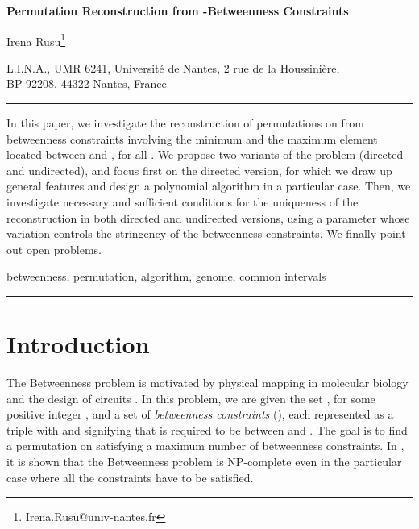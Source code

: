 \documentclass{article}
\begin{document}
\begin{center}
{\bf\large Permutation Reconstruction from -Betweenness Constraints}\\




\vspace*{1cm}

Irena Rusu\footnote{Irena.Rusu@univ-nantes.fr}

L.I.N.A., UMR 6241, Universit\'e de Nantes, 2 rue de
la Houssini\` ere,\\

 BP 92208, 44322 Nantes, France
\end{center}



\vspace*{1cm}

\hrule
\vspace{0.3cm}



In this paper, we investigate the  reconstruction of permutations on  from
betweenness constraints involving the minimum and the maximum element located between 
  and , for all .  We propose two
variants of the problem (directed and undirected), and focus first on the directed version,
for which we draw up general features and design a polynomial algorithm 
in a particular case. Then, we investigate
necessary and  sufficient conditions for the uniqueness of the reconstruction
in both directed and undirected versions, using a parameter  whose variation controls the
stringency of the betweenness constraints. We finally point out open problems.
\medskip

 betweenness, permutation, algorithm, genome, common intervals
\vspace{0.2cm}

\hrule

\section{Introduction}

The {\sc Betweenness} problem is motivated by physical mapping in molecular biology and the design of circuits 
\cite{opatrny1979total}.
In this problem, we are given the set , for some positive integer ,  
and a set of  {\em betweenness constraints} (), each represented as a triple  with  and signifying that  is required to be between  and . The goal is to find a 
permutation on  satisfying a maximum number of betweenness constraints. In \cite{opatrny1979total},
it is shown that the {\sc Betweenness} problem is NP-complete even in the particular case where all the
constraints have to be satisfied.
\end{document}
